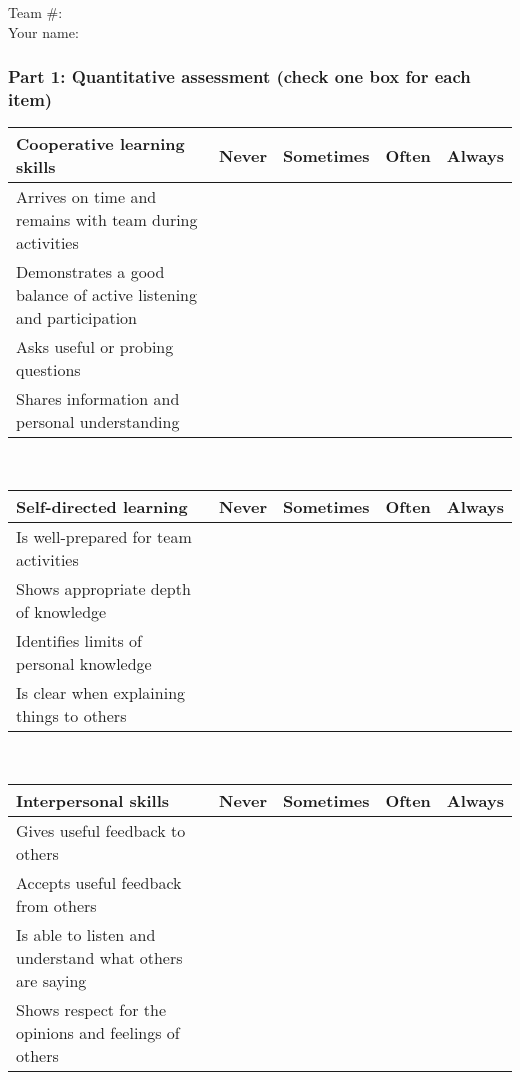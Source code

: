 \documentclass[11pt]{article}
\begin{document}
Team \#:  		\\
Your name:  

\subsubsection*{Part 1: Quantitative assessment (check one box for each item)}
\begin{flushleft}
\begin{tabular}{| p{6cm} | l | l | l | l |}
\hline
\textbf{Cooperative learning skills}&					Never & Sometimes & Often & Always \\	
\hline
Arrives on time and remains with team during activities	&&&&			\\	
\hline
Demonstrates a good balance of active listening and participation			&&&&			\\	
\hline
Asks useful or probing questions			&&&&			\\
\hline
Shares information and personal understanding				&&&&			\\	
\hline
\end{tabular}\\
\vskip 12pt
	
\noindent \begin{tabular}{| p{6cm} | l | l | l | l |}
\hline	
\textbf{Self-directed learning} &					Never & Sometimes & Often & Always \\	
\hline
Is well-prepared for team activities&&&&			\\	
\hline
Shows appropriate depth of knowledge	&&&&			\\
\hline	
Identifies limits of personal knowledge	&&&&			\\	
\hline
Is clear when explaining things to others		&&&&			\\	
\hline		
\end{tabular}\\

	\vskip 12pt			
\noindent \begin{tabular}{| p{6cm} | l | l | l | l |}
\hline	
\textbf{Interpersonal skills} &					Never & Sometimes & Often & Always \\	
\hline
Gives useful feedback to others			&&&&			\\			
\hline
Accepts useful feedback from others			&&&&			\\			
\hline
Is able to listen and understand what others are saying		&&&&			\\				
\hline
Shows respect for the opinions and feelings of others		&&&&			\\				
\hline
\end{tabular}

\end{flushleft}
\end{document}
